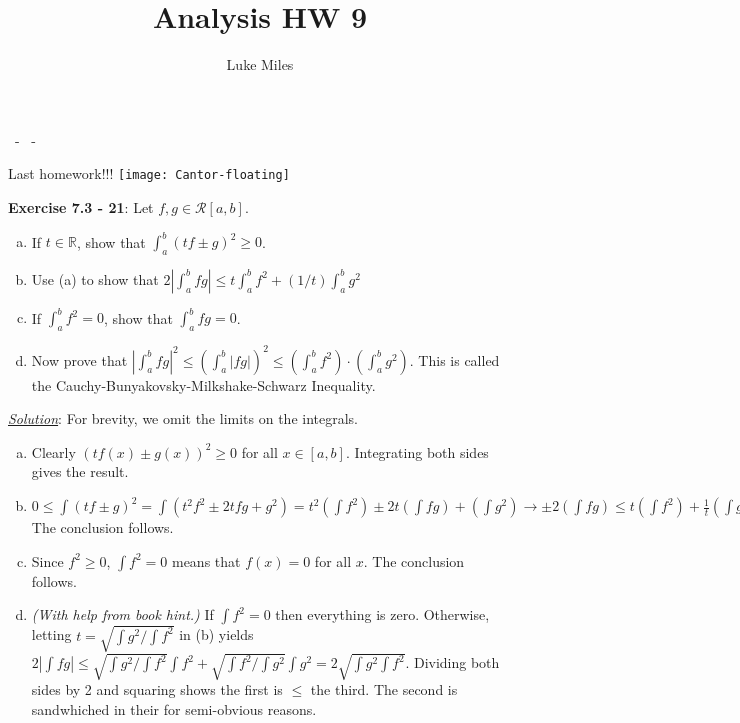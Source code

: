\documentclass{article}
\title{Analysis HW 9}
\author{Luke Miles}
\begin{document}
\raggedright %
\renewcommand{\thefootnote}{\fnsymbol{footnote}} %

\makeatletter
\textsc{\@title\ - \@author\ - \@date}

Last homework!!! \hfill \texttt{[image: Cantor-floating]}
\makeatother

\hrulefill

\textbf{Exercise 7.3 - 21}:
Let $f, g \in \mathcal R[a, b]$.
\begin{enumerate}[(a)]
  \item If $t \in \mathbb R$, show that $\int_a^b (t f \pm g)^2 \geq 0$.
  \item Use (a) to show that $2 \left| \int_a^b f g \right|
    \leq t \int_a^b f^2 + (1/t) \int_a^b g^2$
  \item If $\int_a^b f^2 = 0$, show that $\int_a^b f g = 0$.
  \item Now prove that $\left| \int_a^b f g \right|^2
    \leq \left( \int_a^b |f g| \right)^2
    \leq \left( \int_a^b f^2 \right) \cdot \left( \int_a^b g^2 \right)$.
    This is called the Cauchy-Bunyakovsky-Milkshake-Schwarz Inequality.
\end{enumerate}

\underline{\textit{Solution}}:
For brevity, we omit the limits on the integrals.
\begin{enumerate}[(a)]
  \item Clearly $(t f(x) \pm g(x))^2 \geq 0$ for all $x \in [a, b]$.
    Integrating both sides gives the result.
  \item $%
    0
    \leq \int (t f \pm g)^2
    = \int (t^2 f^2 \pm 2tfg + g^2)
    = t^2 (\int f^2) \pm  2t (\int f g) + (\int g^2)
    \rightarrow
    \pm 2 (\int f g)
    \leq t (\int f^2) + \frac{1}{t} (\int g^2)
    $
    The conclusion follows.
  \item Since $f^2 \geq 0$, $\int f^2 = 0$ means that $f(x) = 0$ for all
    $x$. The conclusion follows.
  \item \textit{(With help from book hint.)} If $\int f^2 = 0$ then
    everything is zero. Otherwise, letting
    $t = \sqrt{\int g^2 / \int f^2}$ in (b) yields
    $2 | \int f g | \leq \sqrt{\int g^2 / \int f^2} \int f^2
    + \sqrt{\int f^2 / \int g^2} \int g^2 = 2 \sqrt{\int g^2 \int f^2}$.
    Dividing both sides by 2 and squaring shows the first is $\leq$
    the third. The second is sandwhiched in their for semi-obvious reasons.
\end{enumerate}
\end{document}
